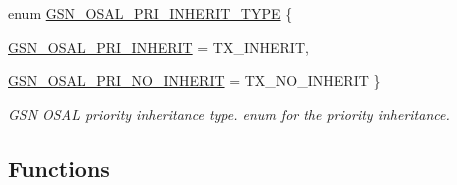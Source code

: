 \begin{DoxyCompactItemize}
enum \hyperlink{a00628_ga4b070e363e5202d1c7e6ffe017b981b9}{GSN\_\-OSAL\_\-PRI\_\-INHERIT\_\-TYPE} \{ \par
\hyperlink{a00628_gga4b070e363e5202d1c7e6ffe017b981b9a9f5a8464df10078a40932796037dbe21}{GSN\_\-OSAL\_\-PRI\_\-INHERIT} =  TX\_\-INHERIT, 
\par
\hyperlink{a00628_gga4b070e363e5202d1c7e6ffe017b981b9af4c1fbe390b0fce01a5e223d4f01364c}{GSN\_\-OSAL\_\-PRI\_\-NO\_\-INHERIT} =  TX\_\-NO\_\-INHERIT
 \}
\begin{DoxyCompactList}\small\item\em GSN OSAL priority inheritance type. enum for the priority inheritance. \end{DoxyCompactList}\end{DoxyCompactItemize}
\subsection*{Functions}
